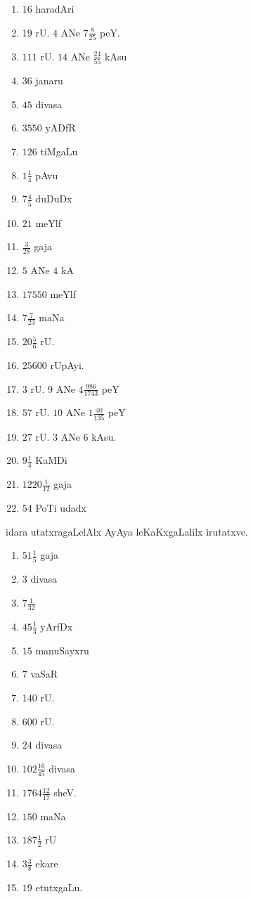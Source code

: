 \begin{multicols}{3}
\begin{enumerate}[$(1)$]
\item $16$ haradAri
\item $19$ rU. $4$ ANe $7 \frac{8}{25}$ peY.
\item $111$ rU. $14$ ANe $\frac{24}{55}$ kAsu
\item $36$ janaru
\item $45$ divasa
\item $3550$ yADfR
\item $126$ tiMgaLu
\item $1\frac{1}{4}$ pAvu
\item $7\frac{4}{5}$ duDuDx
\item $21$ meYlf
\item $\frac{3}{28}$ gaja
\item $5$ ANe $4$ kA
\item $17550$ meYlf
\item $7 \frac{7}{23}$ maNa
\item $20 \frac{5}{6}$ rU.
\item $25600$ rUpAyi.
\item $3$ rU. $9$ ANe $4 \frac{986}{1743}$ peY
\item $57$ rU. $10$ ANe $1 \frac{40}{135}$ peY
\item $27$ rU. $3$ ANe $6$ kAsu.
\item $9\frac{1}{4}$ KaMDi
\item $1220 \frac{1}{12}$ gaja
\item $54$ PoTi udadx
\end{enumerate}
\end{multicols}


idara utatxragaLelAlx AyAya leKaKxgaLalilx irutatxve.

\newpage
{}

\begin{multicols}{3}
\begin{enumerate}[$(1)$]
\item $51\frac{1}{5}$ gaja
\item $3$ divasa
\item $7 \frac{1}{32}$
\item $45\frac{1}{3}$ yArfDx
\item $15$ manuSayxru
\item $7$ vaSaR
\item $140$ rU.
\item $600$ rU.
\item $24$ divasa
\item $102 \frac{16}{45}$ divasa
\item $1764 \frac{12}{17}$ sheV.
\item $150$ maNa
\item $187 \frac{1}{2}$ rU
\item $3 \frac{3}{8}$ ekare
\item $19$ etutxgaLu.
\end{enumerate}
\end{multicols}

